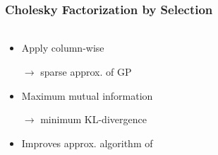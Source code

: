 \documentclass{beamer}                             %
\begin{document}
\begingroup
\let\oldfootnoterule\footnoterule
\renewcommand\footnoterule{\only<3->\oldfootnoterule}
\begin{frame}
\frametitle{Cholesky Factorization by Selection}
\framesubtitle{}

\begin{columns}
  \begin{column}{0.6\textwidth}
    \begin{itemize}
      \item<+-> Apply column-wise

        \( \rightarrow \) sparse approx. of GP

      \item<+-> Maximum mutual information

        \( \rightarrow \) minimum KL-divergence

      \item<+-> Improves approx. algorithm of \footnotemark
    \end{itemize}
  \end{column}
  \begin{column}{0.4\textwidth}
    \begin{figure}[h!]
        \centering
        \begin{subfigure}[h]{\textwidth}
          \begin{tikzpicture}[scale=1/5]
            
          \end{tikzpicture}
        \end{subfigure}
        \begin{subfigure}[h]{0.4 \textwidth}
        \end{subfigure}
    \end{figure}

    \vspace{-0.5cm}


\end{column}
\end{columns}
\end{frame}
\end{document}
